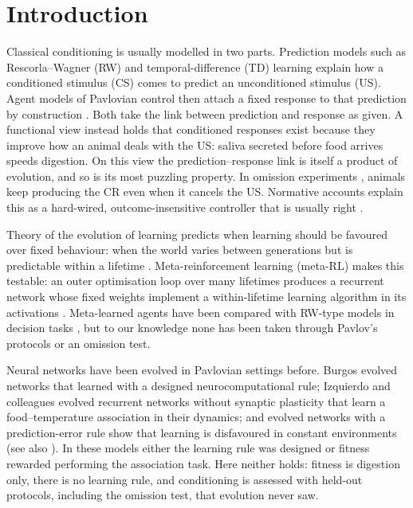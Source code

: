 \documentclass[conference]{IEEEtran}
\begin{document}
\section{Introduction}
Classical conditioning is usually modelled in two parts. Prediction models such as Rescorla--Wagner (RW) \cite{rw72} and temporal-difference (TD) learning \cite{sb90} explain how a conditioned stimulus (CS) comes to predict an unconditioned stimulus (US). Agent models of Pavlovian control then attach a fixed response to that prediction by construction \cite{modayil14,butcher22}. Both take the link between prediction and response as given. A functional view \cite{domjan05,hollis97} instead holds that conditioned responses exist because they improve how an animal deals with the US: saliva secreted before food arrives speeds digestion. On this view the prediction--response link is itself a product of evolution, and so is its most puzzling property. In omission experiments \cite{sheffield65,williams69}, animals keep producing the CR even when it cancels the US. Normative accounts explain this as a hard-wired, outcome-insensitive controller that is usually right \cite{dayan06}.

Theory of the evolution of learning predicts when learning should be favoured over fixed behaviour: when the world varies between generations but is predictable within a lifetime \cite{stephens91,katsnelson12}. Meta-reinforcement learning (meta-RL) makes this testable: an outer optimisation loop over many lifetimes produces a recurrent network whose fixed weights implement a within-lifetime learning algorithm in its activations \cite{wang18,binz23}. Meta-learned agents have been compared with RW-type models in decision tasks \cite{schubert24}, but to our knowledge none has been taken through Pavlov's protocols or an omission test.

Neural networks have been evolved in Pavlovian settings before. Burgos \cite{burgos97} evolved networks that learned with a designed neurocomputational rule; Izquierdo and colleagues \cite{izquierdo07,izquierdo08} evolved recurrent networks without synaptic plasticity that learn a food--temperature association in their dynamics; and evolved networks with a prediction-error rule show that learning is disfavoured in constant environments \cite{kozielska24,mendez23} (see also \cite{niv02}). In these models either the learning rule was designed or fitness rewarded performing the association task. Here neither holds: fitness is digestion only, there is no learning rule, and conditioning is assessed with held-out protocols, including the omission test, that evolution never saw.
\end{document}

